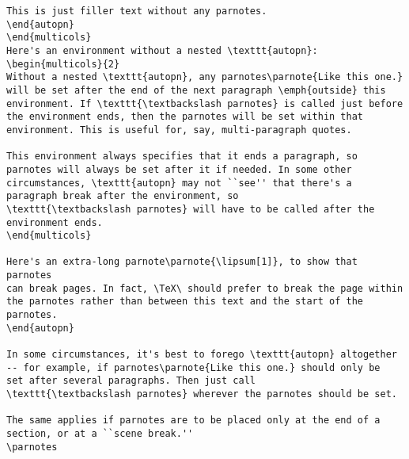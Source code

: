\documentclass[10pt]{article}
\begin{document}
\begin{lstlisting}
This is just filler text without any parnotes.
\end{autopn}
\end{multicols}
Here's an environment without a nested \texttt{autopn}:
\begin{multicols}{2}
Without a nested \texttt{autopn}, any parnotes\parnote{Like this one.}
will be set after the end of the next paragraph \emph{outside} this
environment. If \texttt{\textbackslash parnotes} is called just before
the environment ends, then the parnotes will be set within that
environment. This is useful for, say, multi-paragraph quotes.

This environment always specifies that it ends a paragraph, so
parnotes will always be set after it if needed. In some other
circumstances, \texttt{autopn} may not ``see'' that there's a
paragraph break after the environment, so
\texttt{\textbackslash parnotes} will have to be called after the
environment ends.
\end{multicols}

Here's an extra-long parnote\parnote{\lipsum[1]}, to show that parnotes
can break pages. In fact, \TeX\ should prefer to break the page within
the parnotes rather than between this text and the start of the
parnotes.
\end{autopn}

In some circumstances, it's best to forego \texttt{autopn} altogether
-- for example, if parnotes\parnote{Like this one.} should only be
set after several paragraphs. Then just call
\texttt{\textbackslash parnotes} wherever the parnotes should be set.

The same applies if parnotes are to be placed only at the end of a
section, or at a ``scene break.''
\parnotes


\end{lstlisting}
\end{document}
